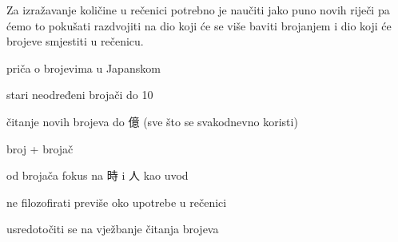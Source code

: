 
\author{Tomislav Mamić}

	
	Za izražavanje količine u rečenici potrebno je naučiti jako puno novih riječi pa ćemo to pokušati razdvojiti na dio koji će se više baviti brojanjem i dio koji će brojeve smjestiti u rečenicu.
	
	
	\begin{hyou}
		\item priča o brojevima u Japanskom
		\item stari neodređeni brojači do 10
		\item čitanje novih brojeva do 億 (sve što se svakodnevno koristi)
		\item broj + brojač
		\item od brojača fokus na 時 i 人 kao uvod
	\end{hyou}
	
	
	\begin{hyou}
		\item ne filozofirati previše oko upotrebe u rečenici
		\item usredotočiti se na vježbanje čitanja brojeva
	\end{hyou}
